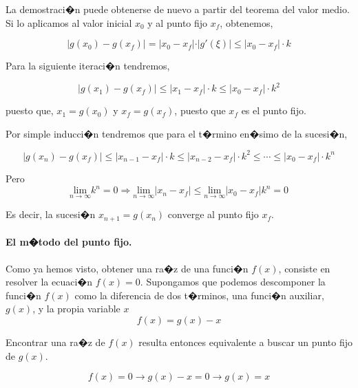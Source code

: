 La demostraci�n puede obtenerse de nuevo a partir del teorema del valor medio.  Si lo aplicamos al valor inicial $x_0$ y al punto fijo $x_f$, obtenemos,

\begin{equation*}
\vert g(x_0)-g(x_f) \vert =\vert x_0-x_f \vert \cdot \vert g'(\xi) \vert \leq \vert x_0-x_f \vert \cdot k 
\end{equation*}

Para la siguiente iteraci�n tendremos,

\begin{equation*}
\vert g(x_1)-g(x_f) \vert \leq \vert x_1-x_f \vert \cdot k \leq \vert x_0-x_f \vert \cdot k^2 
\end{equation*}

puesto que,  $x_1=g(x_0)$ y $x_f = g(x_f)$, puesto que $x_f$ es el punto fijo. 

Por simple inducci�n tendremos que para el t�rmino en�simo de la sucesi�n,

\begin{equation*}
\vert g(x_n)-g(x_f) \vert \leq \vert x_{n-1}-x_f \vert \cdot k \leq \vert x_{n-2}-x_f \vert \cdot k^2 \leq \cdots \leq  \vert x_0-x_f \vert \cdot k^n 
\end{equation*}

Pero
\begin{equation*}
\underset{n\rightarrow \infty}{\text{lim}}k^n=0 \Rightarrow \underset{n\rightarrow \infty}{\text{lim}} \vert x_n-x_f \vert \leq \underset{n\rightarrow \infty}{\text{lim}}\vert x_0-x_f \vert k^n =0
\end{equation*} 

Es decir, la sucesi�n  $x_{n+1}=g(x_n)$ converge al punto fijo $x_f$.


\paragraph{El m�todo del punto fijo.} Como ya hemos visto, obtener una ra�z de una funci�n $f(x)$, consiste en resolver la ecuaci�n $f(x)=0$. Supongamos que podemos descomponer la funci�n $f(x)$ como la diferencia de dos t�rminos, una funci�n auxiliar, $g(x)$, y la propia variable $x$
\begin{equation*}
f(x)=g(x)-x
\end{equation*}

Encontrar una ra�z de $f(x)$ resulta entonces equivalente a buscar un punto fijo de $g(x)$. 

\begin{equation*}
f(x)=0 \rightarrow g(x)-x=0 \rightarrow g(x)=x
\end{equation*}

